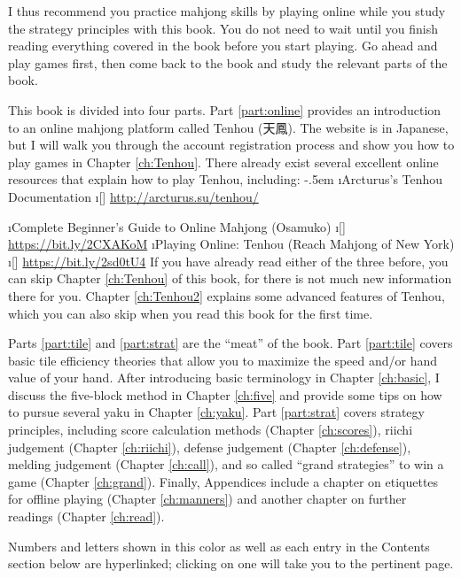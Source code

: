 \bigskip
I thus recommend you practice mahjong skills by playing online while you study the strategy principles with this book. You do not need to wait until you finish reading everything covered in the book before you start playing. Go ahead and play games first, then come back to the book and study the relevant parts of the book. 

\bigskip

This book is divided into four parts. Part \ref{part:online} provides an introduction to an online mahjong platform called {\jap Tenhou} (天鳳). The website is in Japanese, but I will walk you through the account registration process and show you how to play games in Chapter \ref{ch:Tenhou}. There already exist several excellent online resources that explain how to play {\jap Tenhou}, including:
\bi \itemsep-.5em
\i Arcturus's Tenhou Documentation
\vspace{-10pt} 
	\bi
	\i[] \url{http://arcturus.su/tenhou/}
	\ei
	
\i Complete Beginner's Guide to Online Mahjong (Osamuko)
\vspace{-10pt} 
	\bi
	\i[] \url{https://bit.ly/2CXAKoM}
	\ei
\i Playing Online: Tenhou (Reach Mahjong of New York)
	\bi \i[] \url{https://bit.ly/2sd0tU4} \ei
\ei
If you have already read either of the three before, you can skip Chapter \ref{ch:Tenhou} of this book, for there is not much new information there for you. Chapter \ref{ch:Tenhou2} explains some advanced features of {\jap Tenhou}, which you can also skip when you read this book for the first time.

\bigskip
Parts \ref{part:tile} and \ref{part:strat} are the ``meat'' of the book. 
Part \ref{part:tile} covers basic tile efficiency theories that allow you to maximize the speed and/or hand value of your hand. After introducing basic terminology in Chapter \ref{ch:basic}, I discuss the five-block method in Chapter \ref{ch:five} and provide some tips on how to pursue several {\jap yaku} in Chapter \ref{ch:yaku}. 
Part \ref{part:strat} covers strategy principles, including score calculation methods (Chapter \ref{ch:scores}), riichi judgement (Chapter \ref{ch:riichi}), defense judgement (Chapter \ref{ch:defense}), melding judgement (Chapter \ref{ch:call}), and so called ``grand strategies'' to win a game (Chapter \ref{ch:grand}). 
Finally, Appendices include a chapter on etiquettes for offline playing (Chapter \ref{ch:manners}) and another chapter on further readings (Chapter \ref{ch:read}). 

\bigskip
Numbers and letters shown {\color{MyBlue} in this color} as well as each entry in the Contents section below are hyperlinked; clicking on one will take you to the pertinent page. 

